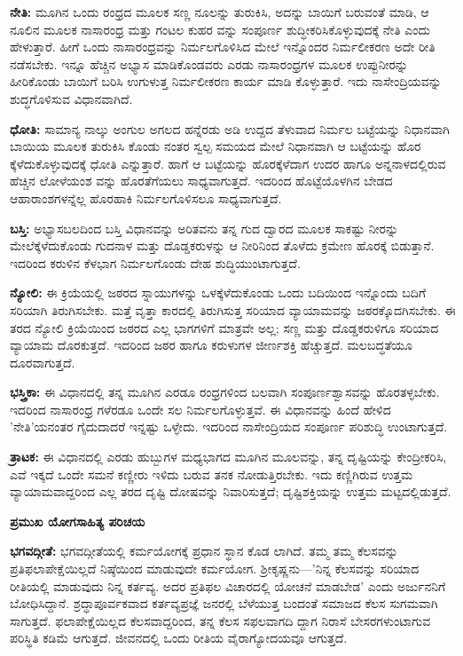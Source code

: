 \textbf{ನೇತಿ:} ಮೂಗಿನ ಒಂದು ರಂಧ್ರದ ಮೂಲಕ ಸಣ್ಣ ನೂಲನ್ನು ತುರುಕಿಸಿ, ಅದನ್ನು ಬಾಯಿಗೆ ಬರುವಂತೆ ಮಾಡಿ, ಆ ನೂಲಿನ ಮೂಲಕ ನಾಸಾರಂಧ್ರ ಮತ್ತು ಗಂಟಲ ಕುಹರ  ವನ್ನು ಸಂಪೂರ್ಣ ಶುದ್ಧೀಕರಿಸಿಕೊಳ್ಳುವುದಕ್ಕೆ ನೇತಿ ಎಂದು ಹೇಳುತ್ತಾರೆ. ಹೀಗೆ ಒಂದು ನಾಸಾರಂಧ್ರವನ್ನು ನಿರ್ಮಲಗೊಳಿಸಿದ ಮೇಲೆ ಇನ್ನೊಂದರ ನಿರ್ಮಲೀಕರಣ ಅದೇ ರೀತಿ ನಡೆಸಬೇಕು. ಇನ್ನೂ ಹೆಚ್ಚಿನ ಅಭ್ಯಾಸ ಮಾಡಿಕೊಂಡವರು ಎರಡು ನಾಸಾರಂಧ್ರಗಳ ಮೂಲಕ ಉಪ್ಪುನೀರನ್ನು ಹೀರಿಕೊಂಡು ಬಾಯಿಗೆ ಬರಿಸಿ ಉಗುಳುತ್ತ ನಿರ್ಮಲೀಕರಣ ಕಾರ್ಯ ಮಾಡಿ ಕೊಳ್ಳುತ್ತಾರೆ. ಇದು ನಾಸೇಂದ್ರಿಯವನ್ನು ಶುದ್ಧಗೊಳಿಸುವ ವಿಧಾನವಾಗಿದೆ.

\textbf{ಧೋತಿ:} ಸಾಮಾನ್ಯ ನಾಲ್ಕು ಅಂಗುಲ ಅಗಲದ ಹನ್ನೆರಡು ಅಡಿ ಉದ್ದದ ತೆಳುವಾದ ನಿರ್ಮಲ ಬಟ್ಟೆಯನ್ನು ನಿಧಾನವಾಗಿ ಬಾಯಿಯ ಮೂಲಕ ತುರುಕಿಸಿ ಕೊಂಡು ನಂತರ ಸ್ವಲ್ಪ ಸಮಯದ ಮೇಲೆ ನಿಧಾನವಾಗಿ ಆ ಬಟ್ಟೆಯನ್ನು ಹೊರ ಕ್ಕೆಳೆದುಕೊಳ್ಳುವುದಕ್ಕೆ ಧೋತಿ ಎನ್ನುತ್ತಾರೆ. ಹಾಗೆ ಆ ಬಟ್ಟೆಯನ್ನು ಹೊರಕ್ಕೆಳೆದಾಗ ಉದರ ಹಾಗೂ ಅನ್ನನಾಳದಲ್ಲಿರುವ ಹೆಚ್ಚಿನ ಲೋಳೆಯಂಶ  ವನ್ನು ಹೊರತೆಗೆಯಲು ಸಾಧ್ಯವಾಗುತ್ತದೆ. ಇದರಿಂದ ಹೊಟ್ಟೆಯೊಳಗಿನ ಬೇಡದ ಆಹಾರಾಂಶಗಳನ್ನೆಲ್ಲ ಹೊರಹಾಕಿ ನಿರ್ಮಲಗೊಳಿಸಲೂ ಸಾಧ್ಯವಾಗುತ್ತದೆ.

\textbf{ಬಸ್ತಿ:} ಅಭ್ಯಾಸಬಲದಿಂದ ಬಸ್ತಿ ವಿಧಾನವನ್ನು ಅರಿತವನು ತನ್ನ ಗುದ ದ್ವಾರದ ಮೂಲಕ ಸಾಕಷ್ಟು ನೀರನ್ನು ಮೇಲೆಕ್ಕೆಳೆದುಕೊಂಡು ಗುದನಾಳ ಮತ್ತು ದೊಡ್ಡಕರುಳನ್ನು ಆ ನೀರಿನಿಂದ ತೊಳೆದು ಕ್ರಮೇಣ ಹೊರಕ್ಕೆ ಬಿಡುತ್ತಾನೆ. ಇದರಿಂದ ಕರುಳಿನ ಕೆಳಭಾಗ ನಿರ್ಮಲಗೊಂಡು ದೇಹ ಶುದ್ಧಿಯುಂಟಾಗುತ್ತದೆ.

\textbf{ನ್ಯೋಲಿ:} ಈ ಕ್ರಿಯೆಯಲ್ಲಿ ಜಠರದ ಸ್ನಾಯುಗಳನ್ನು ಒಳಕ್ಕೆಳೆದುಕೊಂಡು ಒಂದು ಬದಿಯಿಂದ ಇನ್ನೊಂದು ಬದಿಗೆ ಸರಿಯಾಗಿ ತಿರುಗಿಸಬೇಕು. ಮತ್ತೆ ವೃತ್ತಾ ಕಾರದಲ್ಲಿ ತಿರುಗಿಸುತ್ತ ಸರಿಯಾದ ವ್ಯಾಯಾಮವನ್ನು ಜಠರಕ್ಕೊದಗಿಸಬೇಕು. ಈ ತರದ ನ್ಯೋಲಿ ಕ್ರಿಯೆಯಿಂದ ಜಠರದ ಎಲ್ಲ ಭಾಗಗಳಿಗೆ ಮಾತ್ರವೇ ಅಲ್ಲ; ಸಣ್ಣ ಮತ್ತು ದೊಡ್ಡಕರುಳಿಗೂ ಸರಿಯಾದ ವ್ಯಾಯಾಮ ದೊರಕುತ್ತದೆ. ಇದರಿಂದ ಜಠರ ಹಾಗೂ ಕರುಳುಗಳ ಜೀರ್ಣಶಕ್ತಿ ಹೆಚ್ಚುತ್ತದೆ. ಮಲಬದ್ಧತೆಯೂ ದೂರವಾಗುತ್ತದೆ.

\textbf{ಭಸ್ತ್ರಿಕಾ:} ಈ ವಿಧಾನದಲ್ಲಿ ತನ್ನ ಮೂಗಿನ ಎರಡೂ ರಂಧ್ರಗಳಿಂದ ಬಲವಾಗಿ ಸಂಪೂರ್ಣಶ್ವಾಸವನ್ನು ಹೊರತಳ್ಳಬೇಕು. ಇದರಿಂದ ನಾಸಾರಂಧ್ರ ಗಳೆರಡೂ ಒಂದೇ ಸಲ ನಿರ್ಮಲಗೊಳ್ಳುತ್ತವೆ. ಈ ವಿಧಾನವನ್ನು ಹಿಂದೆ ಹೇಳಿದ 'ನೇತಿ'ಯನಂತರ ಗೈದುದಾದರೆ ಇನ್ನಷ್ಟು ಒಳ್ಳೇದು. ಇದರಿಂದ ನಾಸೇಂದ್ರಿಯದ ಸಂಪೂರ್ಣ ಪರಿಶುದ್ಧಿ ಉಂಟಾಗುತ್ತದೆ.

\textbf{ತ್ರಾಟಕ:} ಈ ವಿಧಾನದಲ್ಲಿ ಎರಡು ಹುಬ್ಬುಗಳ ಮಧ್ಯಭಾಗದ ಮೂಗಿನ ಮೂಲವನ್ನು, ತನ್ನ ದೃಷ್ಟಿಯನ್ನು ಕೇಂದ್ರೀಕರಿಸಿ, ಎವೆ ಇಕ್ಕದೆ ಒಂದೇ ಸಮನೆ ಕಣ್ಣೀರು ಇಳಿದು ಬರುವ ತನಕ ನೋಡುತ್ತಿರಬೇಕು. ಇದು ಕಣ್ಣಿಗಿರುವ ಉತ್ತಮ ವ್ಯಾಯಾಮವಾದ್ದರಿಂದ ಎಲ್ಲ ತರದ ದೃಷ್ಟಿ ದೋಷವನ್ನು ನಿವಾರಿಸುತ್ತದೆ; ದೃಷ್ಟಿಶಕ್ತಿಯನ್ನು ಉತ್ತಮ ಮಟ್ಟದಲ್ಲಿಡುತ್ತದೆ.

\textbf{ಪ್ರಮುಖ ಯೋಗಸಾಹಿತ್ಯ ಪರಿಚಯ}

\textbf{ಭಗವದ್ಗೀತೆ:} ಭಗವದ್ಗೀತೆಯಲ್ಲಿ ಕರ್ಮಯೋಗಕ್ಕೆ ಪ್ರಧಾನ ಸ್ಥಾನ ಕೊಡ ಲಾಗಿದೆ. ತಮ್ಮ ತಮ್ಮ ಕೆಲಸವನ್ನು ಪ್ರತಿಫಲಾಪೇಕ್ಷೆಯಿಲ್ಲದೆ ನಿಷ್ಠೆಯಿಂದ ಮಾಡುವುದೇ ಕರ್ಮಯೋಗ. ಶ‍್ರೀಕೃಷ್ಣನು—'ನಿನ್ನ ಕೆಲಸವನ್ನು ಸರಿಯಾದ ರೀತಿಯಲ್ಲಿ ಮಾಡುವುದು ನಿನ್ನ ಕರ್ತವ್ಯ. ಅದರ ಪ್ರತಿಫಲ ವಿಚಾರದಲ್ಲಿ ಯೋಚನೆ ಮಾಡಬೇಡ' ಎಂದು ಅರ್ಜುನನಿಗೆ ಬೋಧಿಸಿದ್ದಾನೆ. ಶ್ರದ್ಧಾಪೂರ್ವಕವಾದ ಕರ್ತವ್ಯಪ್ರಜ್ಞೆ ಜನರಲ್ಲಿ ಬೆಳೆಯುತ್ತ ಬಂದಂತೆ ಸಮಾಜದ ಕೆಲಸ ಸುಗಮವಾಗಿ ಸಾಗುತ್ತದೆ. ಫಲಾಪೇಕ್ಷೆಯಿಲ್ಲದ ಕೆಲಸವಾದ್ದರಿಂದ, ತನ್ನ ಕೆಲಸ ಸಫಲವಾಗದಿ ದ್ದಾಗ ನಿರಾಸೆ ಬೇಸರಗಳುಂಟಾಗುವ ಪರಿಸ್ಥಿತಿ ಕಡಿಮೆ ಆಗುತ್ತದೆ. ಜೀವನದಲ್ಲಿ ಒಂದು ರೀತಿಯ ವೈರಾಗ್ಯೋದಯವೂ ಆಗುತ್ತದೆ.

